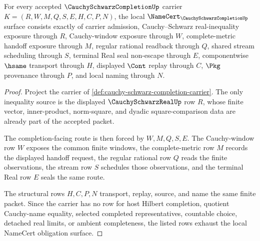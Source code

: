 \begin{theorem}
\label{thm:cauchy-schwarz-completion-namecert-obligations}
For every accepted $\CauchySchwarzCompletionUp$ carrier $K=(R,W,M,Q,S,E,H,C,P,N)$, the local $\NameCert_{\CauchySchwarzCompletionUp}$ surface consists exactly of carrier admission, Cauchy--Schwarz real-inequality exposure through $R$, Cauchy-window exposure through $W$, complete-metric handoff exposure through $M$, regular rational readback through $Q$, shared stream scheduling through $S$, terminal Real seal non-escape through $E$, componentwise $\hsame$ transport through $H$, displayed $\Cont$ replay through $C$, $\Pkg$ provenance through $P$, and local naming through $N$.
\end{theorem}
\begin{proof}
Project the carrier of \autoref{def:cauchy-schwarz-completion-carrier}. The only inequality source is the displayed $\CauchySchwarzRealUp$ row $R$, whose finite vector, inner-product, norm-square, and dyadic square-comparison data are already part of the accepted packet.

The completion-facing route is then forced by $W,M,Q,S,E$. The Cauchy-window row $W$ exposes the common finite windows, the complete-metric row $M$ records the displayed handoff request, the regular rational row $Q$ reads the finite observations, the stream row $S$ schedules those observations, and the terminal Real row $E$ seals the same route.

The structural rows $H,C,P,N$ transport, replay, source, and name the same finite packet. Since the carrier has no row for host Hilbert completion, quotient Cauchy-name equality, selected completed representatives, countable choice, detached real limits, or ambient completeness, the listed rows exhaust the local NameCert obligation surface.
\end{proof}

